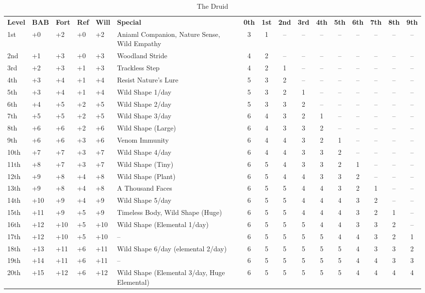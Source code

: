 \begin{table}[htb]
\caption{The Druid}
\centering
\begin{tabular}{*{5}{p{.5cm}}p{3.6cm}*{10}{c}}
\textbf{Level} & \textbf{BAB} & \textbf{Fort} & \textbf{Ref} & \textbf{Will} & \textbf{Special} & \textbf{0th} & \textbf{1st} & \textbf{2nd} & \textbf{3rd} & \textbf{4th} & \textbf{5th} & \textbf{6th} & \textbf{7th} & \textbf{8th} & \textbf{9th} \\
1st & +0 & +2 & +0 & +2 & \raggedright{}Aniaml Companion, Nature Sense, Wild Empathy & 3 & 1 & -- & -- & -- & -- & -- & -- & -- & --\\
2nd & +1 & +3 & +0 & +3 & Woodland Stride & 4 & 2 & -- & -- & -- & -- & -- & -- & -- & --\\
3rd & +2 & +3 & +1 & +3 & Trackless Step & 4 & 2 & 1 & -- & -- & -- & -- & -- & -- & --\\
4th & +3 & +4 & +1 & +4 & Resist Nature's Lure & 5 & 3 & 2 & -- & -- & -- & -- & -- & -- & --\\
5th & +3 & +4 & +1 & +4 & Wild Shape 1/day & 5 & 3 & 2 & 1 & -- & -- & -- & -- & -- & --\\
6th & +4 & +5 & +2 & +5 & Wild Shape 2/day & 5 & 3 & 3 & 2 & -- & -- & -- & -- & -- & --\\
7th & +5 & +5 & +2 & +5 & Wild Shape 3/day & 6 & 4 & 3 & 2 & 1 & -- & -- & -- & -- & --\\
8th & +6 & +6 & +2 & +6 & Wild Shape (Large) & 6 & 4 & 3 & 3 & 2 & -- & -- & -- & -- & --\\
9th & +6 & +6 & +3 & +6 & Venom Immunity & 6 & 4 & 4 & 3 & 2 & 1 & -- & -- & -- & --\\
10th & +7 & +7 & +3 & +7 & Wild Shape 4/day & 6 & 4 & 4 & 3 & 3 & 2 & -- & -- & -- & --\\
11th & +8 & +7 & +3 & +7 & Wild Shape (Tiny) & 6 & 5 & 4 & 3 & 3 & 2 & 1 & -- & -- & --\\
12th & +9 & +8 & +4 & +8 & Wild Shape (Plant) & 6 & 5 & 4 & 4 & 3 & 3 & 2 & -- & -- & --\\
13th & +9 & +8 & +4 & +8 & A Thousand Faces & 6 & 5 & 5 & 4 & 4 & 3 & 2 & 1 & -- & --\\
14th & +10 & +9 & +4 & +9 & Wild Shape 5/day & 6 & 5 & 5 & 4 & 4 & 4 & 3 & 2 & -- & --\\
15th & +11 & +9 & +5 & +9 & \raggedright{}Timeless Body, Wild Shape (Huge) & 6 & 5 & 5 & 4 & 4 & 4 & 3 & 2 & 1 & --\\
16th & +12 & +10 & +5 & +10 & \raggedright{}Wild Shape (Elemental 1/day) & 6 & 5 & 5 & 5 & 4 & 4 & 3 & 3 & 2 & --\\
17th & +12 & +10 & +5 & +10 & -- & 6 & 5 & 5 & 5 & 5 & 4 & 4 & 3 & 2 & 1\\
18th & +13 & +11 & +6 & +11 & \raggedright{}Wild Shape 6/day (elemental 2/day)  & 6 & 5 & 5 & 5 & 5 & 5 & 4 & 3 & 3 & 2\\
19th & +14 & +11 & +6 & +11 & -- & 6 & 5 & 5 & 5 & 5 & 5 & 4 & 4 & 3 & 3\\
20th & +15 & +12 & +6 & +12 & \raggedright{}Wild Shape (Elemental 3/day, Huge Elemental) & 6 & 5 & 5 & 5 & 5 & 5 & 4 & 4 & 4 & 4\\
\end{tabular}
\end{table}

